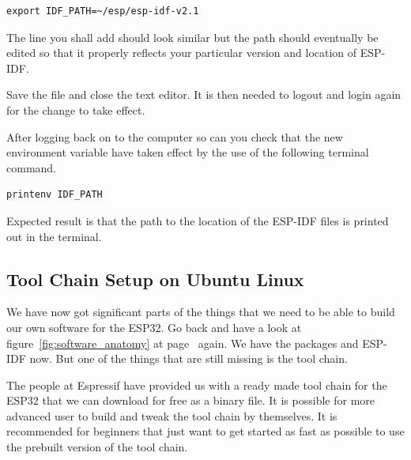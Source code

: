 \documentclass{tufte-book}
\begin{document}
\begin{lstlisting}
export IDF_PATH=~/esp/esp-idf-v2.1
\end{lstlisting}

The line you shall add should look similar but the path should  eventually be edited so that it properly reflects your particular version and location of ESP-IDF.

Save the file and close the text editor. It is then needed to logout and login again for the change to take effect.

After logging back on to the computer so can you check that the new environment variable have taken effect by the use of the following terminal command.

\begin{lstlisting}
printenv IDF_PATH
\end{lstlisting}

Expected result is that the path to the location of the ESP-IDF files is printed out in the terminal.\renewcommand{\textuparrow}{$\uparrow$}

\subsection{Tool Chain Setup on Ubuntu Linux}


We have now got significant parts of the things that we need to be able to build our own software for the ESP32. Go back and have a look at figure~\ref{fig:software_anatomy} at page~\pageref{fig:software_anatomy} again. We have the packages and ESP-IDF now. But one of the things that are still missing is the tool chain.

The people at Espressif have provided us with a ready made tool chain for the ESP32 that we can download for free as a binary file. It is possible for more advanced user to build and tweak the tool chain by themselves. It is recommended for beginners that just want to get started as fast as possible to use the prebuilt version of the tool chain.
\end{document}
